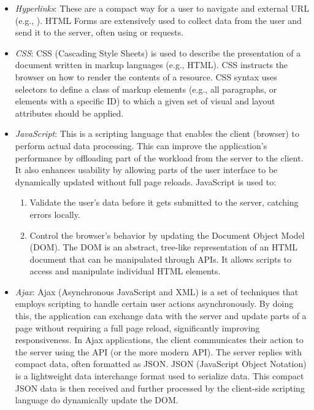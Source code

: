 \begin{itemize}
    \item \textit{Hyperlinks}: These are a compact way for a user to navigate and external URL (e.g., ). HTML Forms are extensively used to collect data from the user and send it to the server, often using  or  requests.
    \item \textit{CSS}: CSS (Cascading Style Sheets) is used to describe the presentation of a document written in markup languages (e.g., HTML). CSS instructs the browser on how to render the contents of a resource. CSS syntax uses selectors to define a class of markup elements (e.g., all paragraphs, or elements with a specific ID) to which a given set of visual and layout attributes should be applied.
    \item \textit{JavaScript}: This is a scripting language that enables the client (browser) to perform actual data processing. This can improve the application's performance by offloading part of the workload from the server to the client. It also enhances usability by allowing parts of the user interface to be dynamically updated without full page reloads. JavaScript is used to:

          \begin{enumerate}
              \item Validate the user's data before it gets submitted to the server, catching errors locally.
              \item Control the browser's behavior by updating the Document Object Model (DOM). The DOM is an abstract, tree-like representation of an HTML document that can be manipulated through APIs. It allows scripts to access and manipulate individual HTML elements.
          \end{enumerate}

    \item \textit{Ajax}: Ajax (Asynchronous JavaScript and XML) is a set of techniques that employs scripting to handle certain user actions asynchronously. By doing this, the application can exchange data with the server and update parts of a page without requiring a full page reload, significantly improving responsiveness. In Ajax applications, the client communicates their action to the server using the  API (or the more modern  API). The server replies with compact data, often formatted as JSON. JSON (JavaScript Object Notation) is a lightweight data interchange format used to serialize data. This compact JSON data is then received and further processed by the client-side scripting language do dynamically update the DOM.
\end{itemize}

